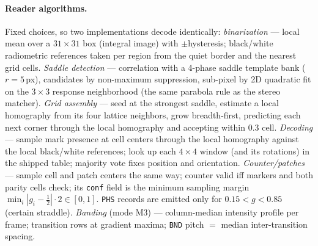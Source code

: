 \documentclass[11pt]{article}
\theoremstyle{definition}
\newcommand{\code}[1]{\texttt{#1}}
\begin{document}
\paragraph{Reader algorithms.} Fixed choices, so two implementations
decode identically:
\emph{binarization} --- local mean over a $31\times31$ box (integral
image) with $\pm$hysteresis; black/white radiometric references taken
per region from the quiet border and the nearest grid cells.
\emph{Saddle detection} --- correlation with a 4-phase saddle template
bank ($r=5$\,px), candidates by non-maximum suppression, sub-pixel by
2D quadratic fit on the $3\times3$ response neighborhood (the same
parabola rule as the stereo matcher).
\emph{Grid assembly} --- seed at the strongest saddle, estimate a local
homography from its four lattice neighbors, grow breadth-first,
predicting each next corner through the local homography and accepting
within $0.3$ cell.
\emph{Decoding} --- sample mark presence at cell centers through the
local homography against the local black/white references; look up each
$4\times4$ window (and its rotations) in the shipped table; majority
vote fixes position and orientation.
\emph{Counter/patches} --- sample cell and patch centers the same way;
counter valid iff markers and both parity cells check; its
\code{conf} field is the minimum sampling margin
$\min_i |g_i - \tfrac12| \cdot 2 \in [0,1]$. \code{PHS} records are
emitted only for $0.15<g<0.85$ (certain straddle).
\emph{Banding} (mode M3) --- column-median intensity profile per frame;
transition rows at gradient maxima; \code{BND} pitch $=$ median
inter-transition spacing.
\end{document}
